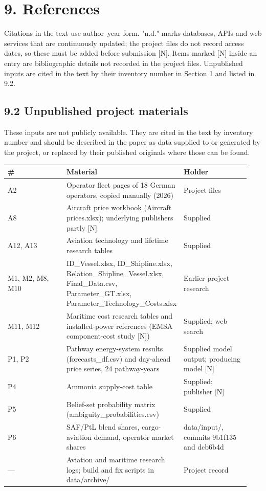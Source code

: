 \documentclass[11pt,a4paper]{article}
\begin{document}
\section*{9. References}

Citations in the text use author–year form. "n.d." marks databases, APIs and web services that are continuously updated; the project files do not record access dates, so these must be added before submission [N]. Items marked [N] inside an entry are bibliographic details not recorded in the project files. Unpublished inputs are cited in the text by their inventory number in Section 1 and listed in 9.2.

\renewcommand{\bibsection}{\subsection*{9.1 Published literature, data and services}}



\subsection*{9.2 Unpublished project materials}

These inputs are not publicly available. They are cited in the text by inventory number and should be described in the paper as data supplied to or generated by the project, or replaced by their published originals where those can be found.

{\small\setlength{\tabcolsep}{3pt}
\begin{longtable}{>{\raggedright\arraybackslash}p{0.315\linewidth}>{\raggedright\arraybackslash}p{0.315\linewidth}>{\raggedright\arraybackslash}p{0.315\linewidth}}
\toprule
\textbf{\#} & \textbf{Material} & \textbf{Holder} \tabularnewline
\midrule
\endhead
A2 & Operator fleet pages of 18 German operators, copied manually (2026) & Project files \tabularnewline
A8 & Aircraft price workbook (Aircraft prices.xlsx); underlying publishers partly [N] & Supplied \tabularnewline
A12, A13 & Aviation technology and lifetime research tables & Supplied \tabularnewline
M1, M2, M8, M10 & ID\_Vessel.xlsx, ID\_Shipline.xlsx, Relation\_Shipline\_Vessel.xlsx, Final\_Data.csv, Parameter\_GT.xlsx, Parameter\_Technology\_Costs.xlsx & Earlier project research \tabularnewline
M11, M12 & Maritime cost research tables and installed-power references (EMSA component-cost study [N]) & Supplied; web search \tabularnewline
P1, P2 & Pathway energy-system results (forecasts\_df.csv) and day-ahead price series, 24 pathway-years & Supplied model output; producing model [N] \tabularnewline
P4 & Ammonia supply-cost table & Supplied; publisher [N] \tabularnewline
P5 & Belief-set probability matrix (ambiguity\_probabilities.csv) & Supplied \tabularnewline
P6 & SAF/PtL blend shares, cargo-aviation demand, operator market shares & data/input/, commits 9b1f135 and dcb6b4d \tabularnewline
— & Aviation and maritime research logs; build and fix scripts in data/archive/ & Project record \tabularnewline
\bottomrule
\end{longtable}}
\end{document}
